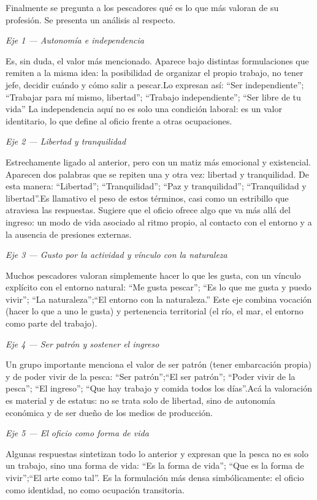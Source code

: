 \documentclass[
  letterpaper,
  DIV=11,
  numbers=noendperiod,
  justified]{scrreprt}
\begin{document}
\newpage

Finalmente se pregunta a los pescadores qué es lo que más valoran de su
profesión. Se presenta un análisis al respecto.

\emph{Eje 1 --- Autonomía e independencia}

Es, sin duda, el valor más mencionado. Aparece bajo distintas
formulaciones que remiten a la misma idea: la posibilidad de organizar
el propio trabajo, no tener jefe, decidir cuándo y cómo salir a
pescar.Lo expresan así: ``Ser independiente''; ``Trabajar para mí mismo,
libertad''; ``Trabajo independiente''; ``Ser libre de tu vida'' La
independencia aquí no es solo una condición laboral: es un valor
identitario, lo que define al oficio frente a otras ocupaciones.

\emph{Eje 2 --- Libertad y tranquilidad}

Estrechamente ligado al anterior, pero con un matiz más emocional y
existencial. Aparecen dos palabras que se repiten una y otra vez:
libertad y tranquilidad. De esta manera: ``Libertad''; ``Tranquilidad'';
``Paz y tranquilidad''; ``Tranquilidad y libertad''.Es llamativo el peso
de estos términos, casi como un estribillo que atraviesa las respuestas.
Sugiere que el oficio ofrece algo que va más allá del ingreso: un modo
de vida asociado al ritmo propio, al contacto con el entorno y a la
ausencia de presiones externas.

\emph{Eje 3 --- Gusto por la actividad y vínculo con la naturaleza}

Muchos pescadores valoran simplemente hacer lo que les gusta, con un
vínculo explícito con el entorno natural: ``Me gusta pescar''; ``Es lo
que me gusta y puedo vivir''; ``La naturaleza'';``El entorno con la
naturaleza.'' Este eje combina vocación (hacer lo que a uno le gusta) y
pertenencia territorial (el río, el mar, el entorno como parte del
trabajo).

\emph{Eje 4 --- Ser patrón y sostener el ingreso}

Un grupo importante menciona el valor de ser patrón (tener embarcación
propia) y de poder vivir de la pesca: ``Ser patrón'';``El ser patrón'';
``Poder vivir de la pesca''; ``El ingreso''; ``Que hay trabajo y comida
todos los días''.Acá la valoración es material y de estatus: no se trata
solo de libertad, sino de autonomía económica y de ser dueño de los
medios de producción.

\emph{Eje 5 --- El oficio como forma de vida}

Algunas respuestas sintetizan todo lo anterior y expresan que la pesca
no es solo un trabajo, sino una forma de vida: ``Es la forma de vida'';
``Que es la forma de vivir'';``El arte como tal''. Es la formulación más
densa simbólicamente: el oficio como identidad, no como ocupación
transitoria.
\end{document}
